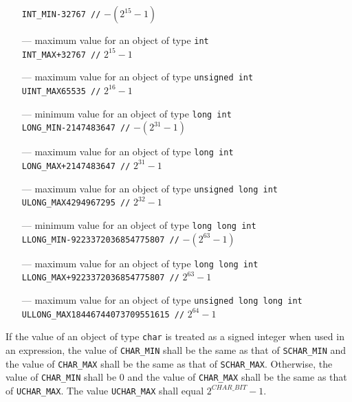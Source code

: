 \begin{itemize}
\texttt{INT\_MIN}\hfil\hspace*{2cm}\texttt{-32767 //} $-(2^{15} - 1)$
\item[---] maximum value for an object of type \texttt{int}\\
\texttt{INT\_MAX}\hfil\hspace*{2cm}\texttt{+32767 //} $2^{15} - 1$
\item[---] maximum value for an object of type \texttt{unsigned int}\\
\texttt{UINT\_MAX}\hfil\hspace*{2cm}\texttt{65535 //} $2^{16} - 1$
\item[---] minimum value for an object of type \texttt{long int}\\
\texttt{LONG\_MIN}\hfil\hspace*{2cm}\texttt{-2147483647 //} $-(2^{31} - 1)$
\item[---] maximum value for an object of type \texttt{long int}\\
\texttt{LONG\_MAX}\hfil\hspace*{2cm}\texttt{+2147483647 //} $2^{31} - 1$
\item[---] maximum value for an object of type \texttt{unsigned long int}\\
\texttt{ULONG\_MAX}\hfil\hspace*{2cm}\texttt{4294967295 //} $2^{32} - 1$
\item[---] minimum value for an object of type \texttt{long long int}\\
\texttt{LLONG\_MIN}\hfil\hspace*{2cm}\texttt{-9223372036854775807 //} $-(2^{63} - 1)$
\item[---] maximum value for an object of type \texttt{long long int}\\
\texttt{LLONG\_MAX}\hfil\hspace*{2cm}\texttt{+9223372036854775807 //} $2^{63} - 1$
\item[---] maximum value for an object of type \texttt{unsigned long long int}\\
\texttt{ULLONG\_MAX}\hfil\hspace*{2cm}\texttt{18446744073709551615 //} $2^{64} - 1$
\end{itemize}

If the value of an object of type \texttt{char} is treated as a signed integer
when used in an expression, the value of \texttt{CHAR\_MIN} shall be the same
as that of \texttt{SCHAR\_MIN} and the value of \texttt{CHAR\_MAX} shall be the
same as that of \texttt{SCHAR\_MAX}. Otherwise, the value of \texttt{CHAR\_MIN}
shall be 0 and the value of \texttt{CHAR\_MAX} shall be the same as that of 
\texttt{UCHAR\_MAX}. The value \texttt{UCHAR\_MAX} shall equal $2^{CHAR\_BIT} -
1$.


